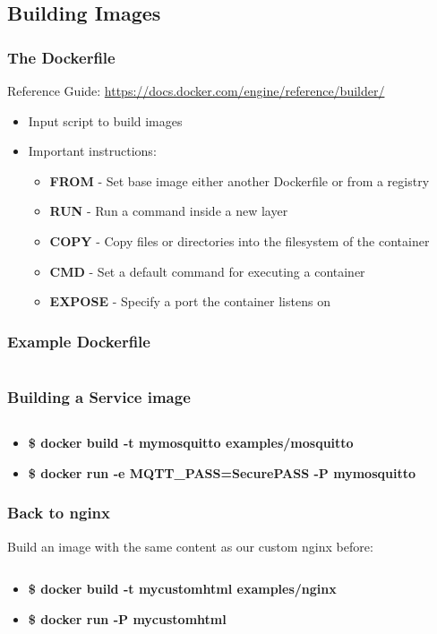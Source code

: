 \documentclass[aspectratio=169,11pt,hyperref={colorlinks=true}]{beamer}
\begin{document}
\subsection{Building Images}
\begin{frame}
    \frametitle{The Dockerfile}
    Reference Guide: \href{https://docs.docker.com/engine/reference/builder/}{https://docs.docker.com/engine/reference/builder/}
    \begin{itemize}
        \item Input script to build images
        \item Important instructions:
        \begin{itemize}
            \item \textbf{FROM} - Set base image either another Dockerfile or from a registry
            \item \textbf{RUN} - Run a command inside a new layer
            \item \textbf{COPY} - Copy files or directories into the filesystem of the container
            \item \textbf{CMD} - Set a default command for executing a container
            \item \textbf{EXPOSE} - Specify a port the container listens on
        \end{itemize}
    \end{itemize}
\end{frame}

\begin{frame}
    \frametitle{Example Dockerfile}
    \inputminted[fontsize=\small,breaklines,linenos,frame=single]{dockerfile}{examples/uwsgi/Dockerfile}
\end{frame}

\begin{frame}
    \frametitle{Building a Service image}
    \inputminted[fontsize=\scriptsize,breaklines,linenos,frame=single]{dockerfile}{examples/mosquitto/Dockerfile}
    \begin{itemize}
        \item \textbf{\$ docker build -t mymosquitto examples/mosquitto}
        \item \textbf{\$ docker run -e MQTT\_PASS=SecurePASS -P mymosquitto}
    \end{itemize}
\end{frame}


\begin{frame}
    \frametitle{Back to nginx}
    Build an image with the same content as our custom nginx before:
    \inputminted[fontsize=\large,breaklines,linenos,frame=single]{dockerfile}{examples/nginx/Dockerfile}
    \begin{itemize}
        \item {\large \textbf{\$ docker build -t mycustomhtml examples/nginx}}
        \item {\large \textbf{\$ docker run -P mycustomhtml}}
    \end{itemize}
\end{frame}
\end{document}
